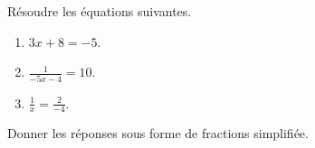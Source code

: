 
\begin{exercice}\label{exosmath-0346}

    Résoudre les équations suivantes.
    \begin{enumerate}
        \item
            \( 3x+8=-5\).
        \item
            \( \frac{1}{ -5x-4 }=10\).
        \item
            \( \frac{1}{ x }=\frac{ 2 }{ -4 }\).
    \end{enumerate}
    Donner les réponses sous forme de fractions simplifiée.

\end{exercice}
